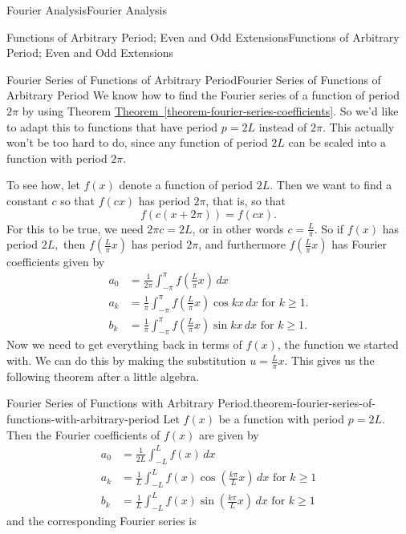 \documentclass[10pt,]{book}
\numberwithin{equation}{section}
\begin{document}
\begin{chapterptx}{Fourier Analysis}{}{Fourier Analysis}{}{}
\begin{sectionptx}{Functions of Arbitrary Period; Even and Odd Extensions}{}{Functions of Arbitrary Period; Even and Odd Extensions}{}{}
\begin{subsectionptx}{Fourier Series of Functions of Arbitrary Period}{}{Fourier Series of Functions of Arbitrary Period}{}{}
\hypertarget{p-394}{}%
We know how to find the Fourier series of a function of period \(2\pi\) by using Theorem \hyperref[theorem-fourier-series-coefficients]{Theorem~\ref{theorem-fourier-series-coefficients}}. So we'd like to adapt this to functions that have period \(p = 2L\) instead of \(2\pi\). This actually won't be too hard to do, since any function of period \(2L\) can be scaled into a function with period \(2\pi\).%
\par
\hypertarget{p-395}{}%
To see how, let \(f(x)\) denote a function of period \(2L\). Then we want to find a constant \(c\) so that \(f(cx)\) has period \(2\pi\), that is, so that%
\begin{equation*}
f(c(x+2\pi)) = f(cx).
\end{equation*}
For this to be true, we need \(2\pi c = 2L\), or in other words \(c = \frac{L}{\pi}\). So if \(f(x)\) has period \(2L,\) then \(f(\frac{L}{\pi}x)\) has period \(2\pi\), and furthermore \(f(\frac{L}{\pi}x)\) has Fourier coefficients given by%
\begin{align*}
a_{0} &= \frac{1}{2\pi}\int_{-\pi}^{\pi}f\left(\frac{L}{\pi}x\right)\,dx\\
a_{k} &= \frac{1}{\pi}\int_{-\pi}^{\pi}f\left(\frac{L}{\pi}x\right)\cos kx\,dx\text{ for $k\geq1$.}\\
b_{k} &= \frac{1}{\pi}\int_{-\pi}^{\pi}f\left(\frac{L}{\pi}x\right)\sin kx\,dx\text{ for $k\geq1$.}
\end{align*}
Now we need to get everything back in terms of \(f(x)\), the function we started with. We can do this by making the substitution \(u = \frac{L}{\pi}x\). This gives us the following theorem after a little algebra.%
\begin{theorem}{Fourier Series of Functions with Arbitrary Period.}{}{theorem-fourier-series-of-functions-with-arbitrary-period}%
\hypertarget{p-396}{}%
Let \(f(x)\) be a function with period \(p = 2L\). Then the Fourier coefficients of \(f(x)\) are given by%
\begin{align*}
a_{0} &= \frac{1}{2L}\int_{-L}^{L}f\left(x\right)\,dx\\
a_{k} &= \frac{1}{L}\int_{-L}^{L}f\left(x\right)\cos\left(\frac{k\pi}{L}x\right)\,dx\text{ for $k\geq1$}\\
b_{k} &= \frac{1}{L}\int_{-L}^{L}f\left(x\right)\sin\left(\frac{k\pi}{L}x\right)\,dx\text{ for $k\geq1$}
\end{align*}
and the corresponding Fourier series is%
\begin{equation*}

\end{equation*}
\end{theorem}
\end{subsectionptx}
\end{sectionptx}
\end{chapterptx}
\end{document}
